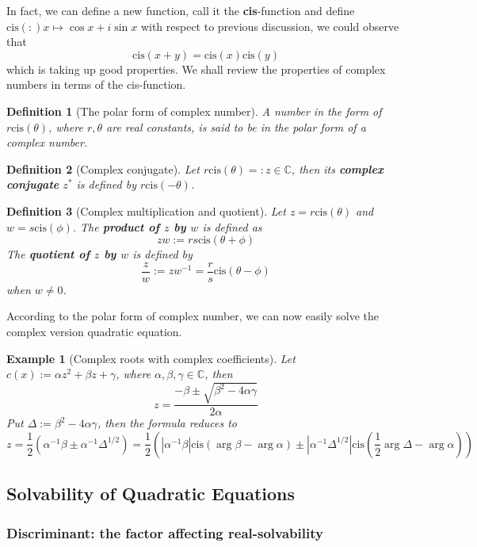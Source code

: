 \documentclass[12pt]{article}
\newcommand{\cis}[1]{\mathrm{cis}({#1})}
\newtheorem{definition}{Definition}[section]
\newtheorem*{example}{Example}
\begin{document}
    In fact, we can define a new function, call it the \textbf{cis}-function and define $\cis:x\mapsto \cos{x}+i\sin{x}$ with respect to previous discussion, we could observe that \[\cis{x+y}=\cis{x}\cis{y}\] which is taking up good properties. We shall review the properties of complex numbers in terms of the cis-function.

    \begin{definition}[The polar form of complex number]
        A number in the form of $r\cis{\theta}$, where $r,\theta$ are real constants, is said to be in the polar form of a complex number.
    \end{definition}

    \begin{definition}[Complex conjugate]
        Let $r\cis{\theta}=:z\in\mathbb{C}$, then its \textbf{complex conjugate} $z^*$ is defined by $r\cis{-\theta}$.
    \end{definition}

    \begin{definition}[Complex multiplication and quotient]
        Let $z=r\cis{\theta}$ and $w=s\cis{\phi}$. The \textbf{product of $z$ by $w$} is defined as \[zw:=rs\cis{\theta+\phi}\] The \textbf{quotient of $z$ by $w$} is defined by \[\frac{z}{w}:=zw^{-1}=\frac{r}{s}\cis{\theta-\phi}\] when $w\neq 0$.
    \end{definition}

    According to the polar form of complex number, we can now easily solve the complex version quadratic equation.

    \begin{example}[Complex roots with complex coefficients]
        Let $c(x):=\alpha z^2+\beta z+\gamma$, where $\alpha,\beta,\gamma\in\mathbb{C}$, then \[z=\frac{-\beta \pm\sqrt{\beta^2-4\alpha\gamma}}{2\alpha}\]
        Put $\Delta:=\beta^2-4\alpha\gamma$, then the formula reduces to \[z=\frac{1}{2}(\alpha^{-1}\beta\pm\alpha^{-1}\Delta^{1/2})=\frac{1}{2}(|\alpha^{-1}\beta|\cis{\arg{\beta}-\arg{\alpha}}\pm|\alpha^{-1}\Delta^{1/2}|\cis{\frac{1}{2}\arg{\Delta}-\arg{\alpha}})\]
    \end{example}

    \subsection{Solvability of Quadratic Equations}

    \subsubsection*{Discriminant: the factor affecting real-solvability}
\end{document}
